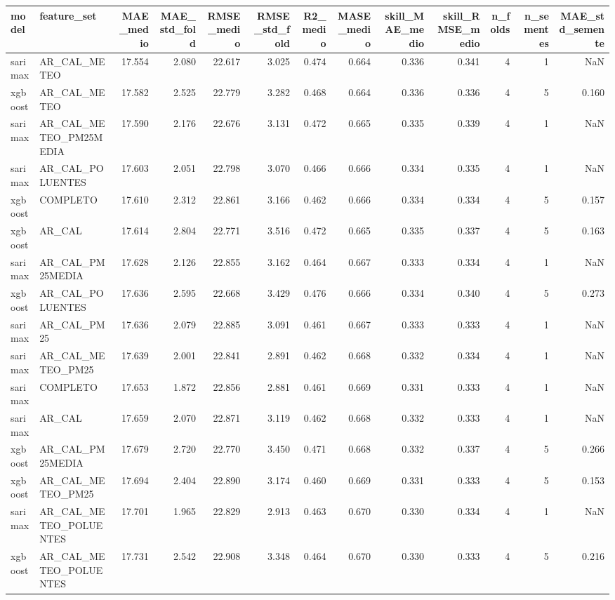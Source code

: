 \begin{tabular}{llrrrrrrrrrrr}
\toprule
model & feature_set & MAE_medio & MAE_std_fold & RMSE_medio & RMSE_std_fold & R2_medio & MASE_medio & skill_MAE_medio & skill_RMSE_medio & n_folds & n_sementes & MAE_std_semente \\
\midrule
sarimax & AR_CAL_METEO & 17.554 & 2.080 & 22.617 & 3.025 & 0.474 & 0.664 & 0.336 & 0.341 & 4 & 1 & NaN \\
xgboost & AR_CAL_METEO & 17.582 & 2.525 & 22.779 & 3.282 & 0.468 & 0.664 & 0.336 & 0.336 & 4 & 5 & 0.160 \\
sarimax & AR_CAL_METEO_PM25MEDIA & 17.590 & 2.176 & 22.676 & 3.131 & 0.472 & 0.665 & 0.335 & 0.339 & 4 & 1 & NaN \\
sarimax & AR_CAL_POLUENTES & 17.603 & 2.051 & 22.798 & 3.070 & 0.466 & 0.666 & 0.334 & 0.335 & 4 & 1 & NaN \\
xgboost & COMPLETO & 17.610 & 2.312 & 22.861 & 3.166 & 0.462 & 0.666 & 0.334 & 0.334 & 4 & 5 & 0.157 \\
xgboost & AR_CAL & 17.614 & 2.804 & 22.771 & 3.516 & 0.472 & 0.665 & 0.335 & 0.337 & 4 & 5 & 0.163 \\
sarimax & AR_CAL_PM25MEDIA & 17.628 & 2.126 & 22.855 & 3.162 & 0.464 & 0.667 & 0.333 & 0.334 & 4 & 1 & NaN \\
xgboost & AR_CAL_POLUENTES & 17.636 & 2.595 & 22.668 & 3.429 & 0.476 & 0.666 & 0.334 & 0.340 & 4 & 5 & 0.273 \\
sarimax & AR_CAL_PM25 & 17.636 & 2.079 & 22.885 & 3.091 & 0.461 & 0.667 & 0.333 & 0.333 & 4 & 1 & NaN \\
sarimax & AR_CAL_METEO_PM25 & 17.639 & 2.001 & 22.841 & 2.891 & 0.462 & 0.668 & 0.332 & 0.334 & 4 & 1 & NaN \\
sarimax & COMPLETO & 17.653 & 1.872 & 22.856 & 2.881 & 0.461 & 0.669 & 0.331 & 0.333 & 4 & 1 & NaN \\
sarimax & AR_CAL & 17.659 & 2.070 & 22.871 & 3.119 & 0.462 & 0.668 & 0.332 & 0.333 & 4 & 1 & NaN \\
xgboost & AR_CAL_PM25MEDIA & 17.679 & 2.720 & 22.770 & 3.450 & 0.471 & 0.668 & 0.332 & 0.337 & 4 & 5 & 0.266 \\
xgboost & AR_CAL_METEO_PM25 & 17.694 & 2.404 & 22.890 & 3.174 & 0.460 & 0.669 & 0.331 & 0.333 & 4 & 5 & 0.153 \\
sarimax & AR_CAL_METEO_POLUENTES & 17.701 & 1.965 & 22.829 & 2.913 & 0.463 & 0.670 & 0.330 & 0.334 & 4 & 1 & NaN \\
xgboost & AR_CAL_METEO_POLUENTES & 17.731 & 2.542 & 22.908 & 3.348 & 0.464 & 0.670 & 0.330 & 0.333 & 4 & 5 & 0.216 \\

\end{tabular}
